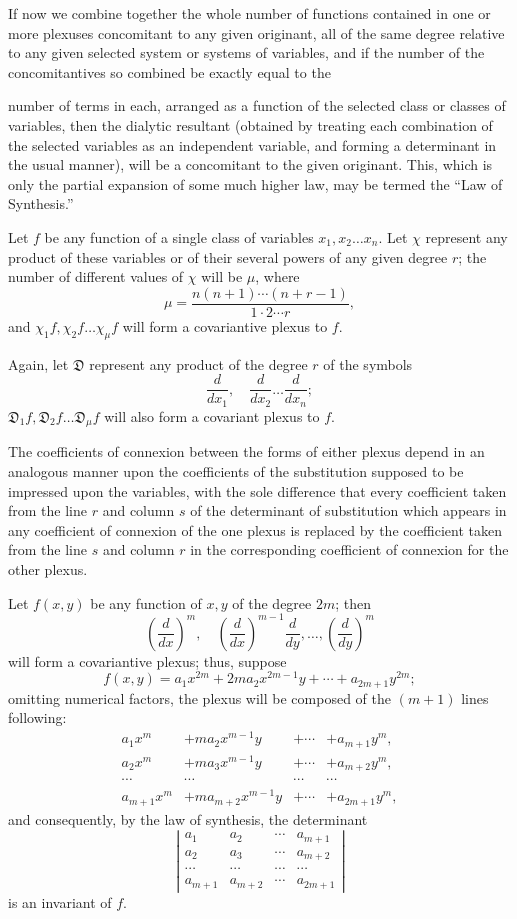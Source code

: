 \documentclass[11pt]{article}
\newcommand{\sourcepage}[1]{\marginpar{\scriptsize p.~#1}}
\begin{document}
{{If now we combine together the whole number of functions contained in one or more plexuses concomitant to any given originant, all of the same degree relative to any given selected system or systems of variables, and if the number of the concomitantives so combined be exactly equal to the

\sourcepage{292}
number of terms in each, arranged as a function of the selected class or classes of variables, then the dialytic resultant (obtained by treating each combination of the selected variables as an independent variable, and forming a determinant in the usual manner), will be a concomitant to the given originant. This, which is only the partial expansion of some much higher law, may be termed the ``Law of Synthesis.''

Let $f$ be any function of a single class of variables $x_1,x_2\ldots x_n$. Let $\chi$ represent any product of these variables or of their several powers of any given degree $r$; the number of different values of $\chi$ will be $\mu$, where
\[
\mu=\frac{n(n+1)\cdots(n+r-1)}{1\cdot2\cdots r},
\]
and $\chi_1f,\chi_2f\ldots\chi_\mu f$ will form a covariantive plexus to $f$.

Again, let $\mathfrak D$ represent any product of the degree $r$ of the symbols
\[
\frac{d}{dx_1},\quad \frac{d}{dx_2}\ldots\frac{d}{dx_n};
\]
$\mathfrak D_1f,\mathfrak D_2f\ldots\mathfrak D_\mu f$ will also form a covariant plexus to $f$.

The coefficients of connexion between the forms of either plexus depend in an analogous manner upon the coefficients of the substitution supposed to be impressed upon the variables, with the sole difference that every coefficient taken from the line $r$ and column $s$ of the determinant of substitution which appears in any coefficient of connexion of the one plexus is replaced by the coefficient taken from the line $s$ and column $r$ in the corresponding coefficient of connexion for the other plexus.

Let $f(x,y)$ be any function of $x,y$ of the degree $2m$; then
\[
\left(\frac{d}{dx}\right)^m,
\quad
\left(\frac{d}{dx}\right)^{m-1}\frac{d}{dy},
\ldots,
\left(\frac{d}{dy}\right)^m
\]
will form a covariantive plexus; thus, suppose
\[
f(x,y)=a_1x^{2m}+2ma_2x^{2m-1}y+\cdots+a_{2m+1}y^{2m};
\]
omitting numerical factors, the plexus will be composed of the $(m+1)$ lines following:
\[
\begin{array}{cccc}
a_1x^m&+ma_2x^{m-1}y&+\cdots&+a_{m+1}y^m,\\
a_2x^m&+ma_3x^{m-1}y&+\cdots&+a_{m+2}y^m,\\
\cdots&\cdots&\cdots&\cdots\\
a_{m+1}x^m&+ma_{m+2}x^{m-1}y&+\cdots&+a_{2m+1}y^m,
\end{array}
\]
and consequently, by the law of synthesis, the determinant
\[
\left|\begin{array}{cccc}
a_1&a_2&\cdots&a_{m+1}\\
a_2&a_3&\cdots&a_{m+2}\\
\cdots&\cdots&\cdots&\cdots\\
a_{m+1}&a_{m+2}&\cdots&a_{2m+1}
\end{array}\right|
\]
is an invariant of $f$.

}}
\end{document}
